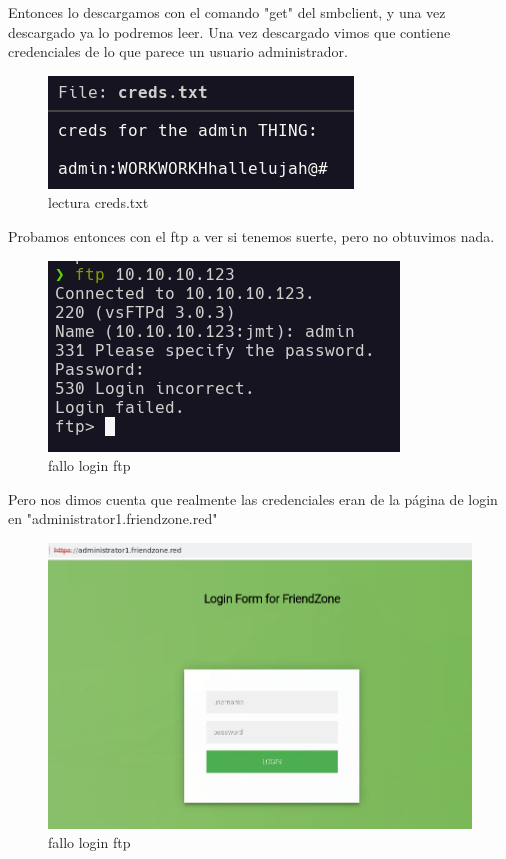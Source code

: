 \documentclass{article}
\begin{document}
Entonces lo descargamos con el comando "get" del smbclient, y una vez descargado ya lo podremos leer.
Una vez descargado vimos que contiene credenciales de lo que parece un usuario administrador.

\begin{figure}[H]
	\center
	\includegraphics[width=\textwidth]{images/friendzone/cat-creds.png}
	\caption{lectura creds.txt}
\end{figure}

Probamos entonces con el ftp a ver si tenemos suerte, pero no obtuvimos nada.

\begin{figure}[H]
	\center
	\includegraphics[width=\textwidth]{images/friendzone/login-ftp-fallido.png}
	\caption{fallo login ftp}
\end{figure}

Pero nos dimos cuenta que realmente las credenciales eran de la página de login en "administrator1.friendzone.red"

\begin{figure}[H]
	\center
	\includegraphics[width=\textwidth]{images/friendzone/login-administrator.png}
	\caption{fallo login ftp}
\end{figure}
\end{document}
